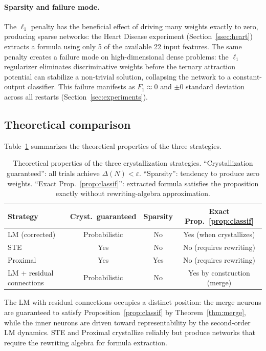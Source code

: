 \documentclass[10pt,a4paper,twoside]{article}
\begin{document}
\paragraph{Sparsity and failure mode.}
The $\ell_1$ penalty has the beneficial effect of driving many weights exactly
to zero, producing sparse networks: the Heart Disease experiment (Section~\ref{ssec:heart})
extracts a formula using only 5 of the available 22 input features.
The same penalty creates a failure mode on high-dimensional dense problems:
the $\ell_1$ regularizer eliminates discriminative weights before
the ternary attraction potential can stabilize a non-trivial solution,
collapsing the network to a constant-output classifier.
This failure manifests as $F_1 \approx 0$ and $\pm 0$ standard deviation across
all restarts (Section~\ref{sec:experiments}).

\subsection{Theoretical comparison}
\label{ssec:comparison}

Table~\ref{tab:theory} summarizes the theoretical properties of the three strategies.

\begin{table}[h]
\centering
\caption{Theoretical properties of the three crystallization strategies.
``Crystallization guaranteed'': all trials achieve $\Delta(N) < \varepsilon$.
``Sparsity'': tendency to produce zero weights.
``Exact Prop.~\ref{prop:classif}'': extracted formula satisfies the proposition
exactly without rewriting-algebra approximation.}
\label{tab:theory}
\setlength{\tabcolsep}{5pt}
\begin{tabular}{lccc}
\toprule
Strategy & Cryst.\ guaranteed & Sparsity & Exact Prop.~\ref{prop:classif} \\
\midrule
LM (corrected)            & Probabilistic & No  & Yes (when crystallizes) \\
STE                        & Yes           & No  & No (requires rewriting) \\
Proximal                   & Yes           & Yes & No (requires rewriting) \\
LM + residual connections  & Probabilistic & No  & Yes by construction (merge) \\
\bottomrule
\end{tabular}
\end{table}

The LM with residual connections occupies a distinct position: the merge
neurons are guaranteed to satisfy Proposition~\ref{prop:classif} by
Theorem~\ref{thm:merge}, while the inner neurons are driven toward
representability by the second-order LM dynamics.
STE and Proximal crystallize reliably but produce networks that require the
rewriting algebra for formula extraction.
\end{document}
